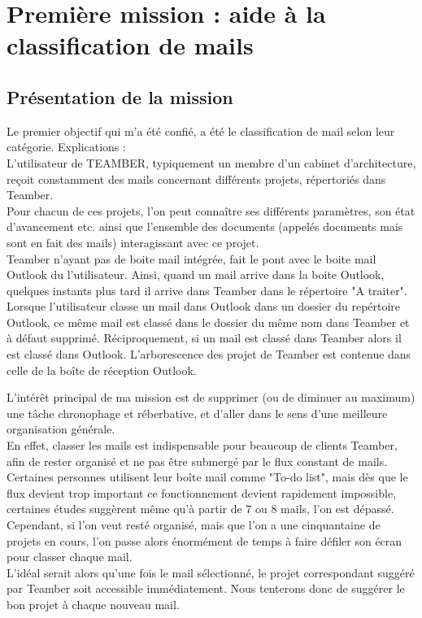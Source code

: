 \documentclass[12pt]{article}
\begin{document}
\newpage

\section{Première mission : aide à la classification de mails}

\subsection{Présentation de la mission}
Le premier objectif qui m'a été confié, a été le classification de mail selon leur catégorie. Explications : \\

L'utilisateur de TEAMBER, typiquement un membre d'un cabinet d'architecture, reçoit constamment des mails concernant différents projets, répertoriés dans Teamber.\\
Pour chacun de ces projets, l'on peut connaître ses différents paramètres, son état d'avancement etc. ainsi que l'ensemble des documents (appelés documents mais sont en fait des mails) interagissant avec ce projet.\\
Teamber n'ayant pas de boite mail intégrée, fait le pont avec le boite mail Outlook du l'utilisateur. Ainsi, quand un mail arrive dans la boite Outlook, quelques instants plus tard il arrive dans Teamber dans le répertoire "A traiter". Lorsque l'utilisateur classe un mail dans Outlook dans un dossier du repértoire Outlook, ce même mail est classé dans le dossier du même nom dans Teamber et à défaut supprimé. Réciproquement, si un mail est classé dans Teamber alors il est classé dans Outlook. L'arborescence des projet de Teamber est contenue dans celle de la boîte de réception Outlook.

L'intérêt principal de ma mission est de supprimer (ou de diminuer au maximum) une tâche chronophage et réberbative, et d'aller dans le sens d'une meilleure organisation générale.\\
En effet, classer les mails est indispensable pour beaucoup de clients Teamber, afin de rester organisé et ne pas être submergé par le flux constant de mails. Certaines personnes utilisent leur boîte mail comme "To-do list", mais dès que le flux devient trop important ce fonctionnement devient rapidement impossible, certaines études suggèrent même qu'à partir de 7 ou 8 mails, l'on est dépassé.\\
Cependant, si l'on veut resté organisé, mais que l'on a une cinquantaine de projets en cours, l'on passe alors énormément de temps à faire défiler son écran pour classer chaque mail.\\
L'idéal serait alors qu'une fois le mail sélectionné, le projet correspondant suggéré par Teamber soit accessible immédiatement. Nous tenterons donc de suggérer le bon projet à chaque nouveau mail.
\end{document}
